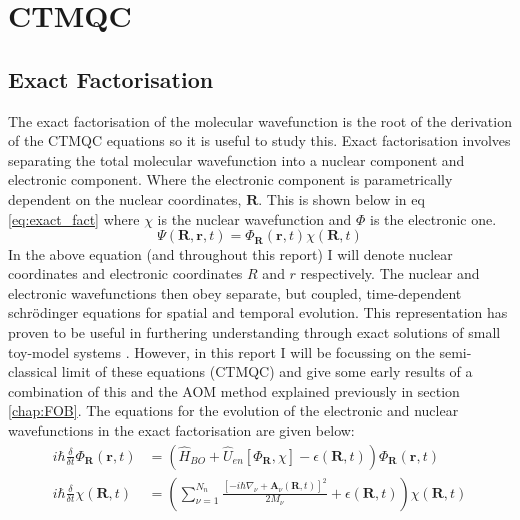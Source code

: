 
\chapter{CTMQC}
\label{chap:CTMQC}


\section{Exact Factorisation}
The exact factorisation of the molecular wavefunction \cite{abedi_exact_2010} is the root of the derivation of the CTMQC equations so it is useful to study this. Exact factorisation involves separating the total molecular wavefunction into a nuclear component and electronic component. Where the electronic component is parametrically dependent on the nuclear coordinates, $\textbf{R}$. This is shown below in eq \eqref{eq:exact_fact} where $\chi$ is the nuclear wavefunction and $\Phi$ is the electronic one.
\begin{equation}
 \Psi(\textbf{R}, \textbf{r}, t) = \Phi_{\textbf{R}}(\textbf{r}, t) \chi(\textbf{R}, t)
 \label{eq:exact_fact}
 \end{equation}
In the above equation (and throughout this report) I will denote nuclear coordinates and electronic coordinates $R$ and $r$ respectively. The nuclear and electronic wavefunctions then obey separate, but coupled, time-dependent schr\"odinger equations for spatial and temporal evolution. This representation has proven to be useful in furthering understanding through exact solutions of small toy-model systems \cite{agostini_quantum-classical_2016, gossel_coupled-trajectory_2018}. However, in this report I will be focussing on the semi-classical limit of these equations (CTMQC) and give some early results of a combination of this and the AOM method explained previously in section \ref{chap:FOB}.
The equations for the evolution of the electronic and nuclear wavefunctions in the exact factorisation \cite{abedi_exact_2010} are given below:
\begin{align}
  i\hbar \frac{\delta}{\delta t} \Phi_{\textbf{R}}(\textbf{r}, t) &= \left( \hat{H}_{BO} + \hat{U}_{en}\left[ \Phi_{\textbf{R}}, \chi\right] - \epsilon(\textbf{R}, t) \right) \Phi_{\textbf{R}} (\textbf{r}, t)
  \label{eq:electronic_exact}
\\
i\hbar \frac{\delta}{\delta t} \chi (\textbf{R}, t) &= \left( \sum_{\nu = 1}^{N_{n}} \frac{[-i\hbar\nabla_{\nu} + \textbf{A}_{\nu}(\textbf{R}, t)]^2}{2 M_{\nu}} + \epsilon(\textbf{R}, t)\right) \chi (\textbf{R}, t)
  \label{eq:nuclear_exact}
\end{align}

